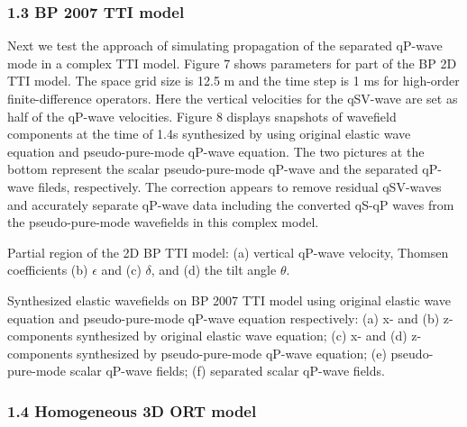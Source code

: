 \subsubsection{1.3 BP 2007 TTI model}

Next we test the approach of simulating propagation of the separated qP-wave mode
in a complex TTI model. Figure 7 shows parameters for part of
the BP 2D TTI model. The space grid size is 12.5 m and the time step is 1 ms for 
high-order finite-difference operators. Here the vertical velocities for the qSV-wave are set as
 half of the qP-wave velocities. 
Figure 8 displays snapshots of wavefield components at the time of 1.4s
synthesized by using original elastic wave equation and pseudo-pure-mode qP-wave equation.
The two pictures at the bottom 
represent the scalar pseudo-pure-mode qP-wave and the separated qP-wave fileds, respectively.
The correction appears to remove residual qSV-waves and accurately separate qP-wave data 
including the converted qS-qP waves from
the pseudo-pure-mode wavefields in this complex model.

{
Partial region of the 2D BP TTI model: (a) vertical qP-wave velocity, Thomsen coefficients
 (b) $\epsilon$ and (c) $\delta$, and (d) the tilt angle $\theta$. 
}

{
Synthesized elastic wavefields on BP 2007 TTI model using original elastic wave equation and pseudo-pure-mode 
qP-wave equation respectively: (a) x- and 
(b) z-components synthesized by original elastic wave equation; (c) x- and
 (d) z-components synthesized by pseudo-pure-mode qP-wave equation; 
 (e) pseudo-pure-mode scalar qP-wave fields; (f) separated scalar qP-wave fields.
}

\subsubsection{1.4 Homogeneous 3D ORT model}


